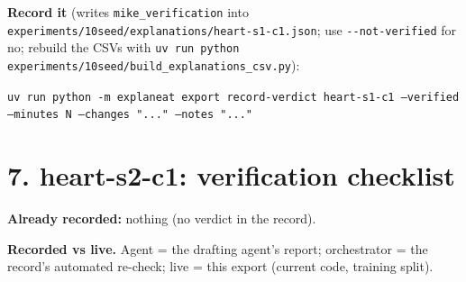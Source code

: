 \documentclass[a4paper,11pt]{article}
\begin{document}
\textbf{Record it} (writes \texttt{mike\_verification} into \texttt{experiments/10seed/explanations/heart-s1-c1.json}; use \texttt{-{}-not-verified} for no; rebuild the CSVs with \texttt{uv run python experiments/10seed/build\_explanations\_csv.py}):

{\footnotesize\raggedright\texttt{uv run python -m explaneat export record-verdict heart-s1-c1 --verified --minutes N --changes "..." --notes "..."}\par}


\clearpage


















\clearpage
\section*{7. heart-s2-c1: verification checklist}
\label{rev:heart-s2-c1}
\textbf{Already recorded:} nothing (no verdict in the record).

\textbf{Recorded vs live.} Agent = the drafting agent's report; orchestrator = the record's automated re-check; live = this export (current code, training split).
\end{document}
